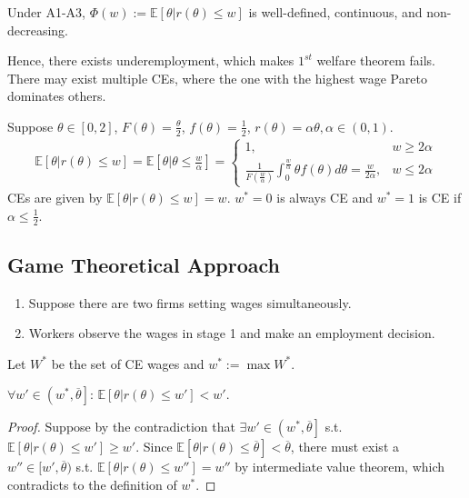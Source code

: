 \documentclass[11pt]{elegantbook_2}
\begin{document}
\begin{lemma}
    Under A1-A3, $\Phi(w):=\mathbb{E}[\theta|r(\theta)\leq w]$ is well-defined, continuous, and non-decreasing.
\end{lemma}

Hence, there exists underemployment, which makes $1^{st}$ welfare theorem fails. There may exist multiple CEs, where the one with the highest wage Pareto dominates others.

\begin{example}
    Suppose $\theta\in[0,2]$, $F(\theta)=\frac{\theta}{2}$, $f(\theta)=\frac{1}{2}$, $r(\theta)=\alpha\theta,\alpha\in(0,1)$.
    \begin{equation}
        \begin{aligned}
            \mathbb{E}[\theta|r(\theta)\leq w]=\mathbb{E}\left[\theta|\theta \leq \frac{w}{\alpha}\right]=\left\{\begin{matrix}
                1,&w\geq 2\alpha\\
                \frac{1}{F\left(\frac{w}{\alpha}\right)}\int_0^{\frac{w}{\alpha}}\theta f(\theta)d\theta=\frac{w}{2\alpha},&w\leq 2\alpha
            \end{matrix}\right.
        \end{aligned}
        \nonumber
    \end{equation}
    CEs are given by $\mathbb{E}[\theta|r(\theta)\leq w]=w$. $w^*=0$ is always CE and $w^*=1$ is CE if $\alpha\leq\frac{1}{2}$.
\end{example}

\subsection{Game Theoretical Approach}
\begin{enumerate}
    \item Suppose there are two firms setting wages simultaneously.
    \item Workers observe the wages in stage 1 and make an employment decision.
\end{enumerate}
Let $W^*$ be the set of CE wages and $w^*:=\max W^*$.
\begin{lemma}\label{lemma:ad_l2}
    $\forall w'\in\left(w^*,\overline{\theta}\right]$: $\mathbb{E}[\theta|r(\theta)\leq w']<w'$.
\end{lemma}
\begin{proof}
    Suppose by the contradiction that $\exists w'\in \left(w^*,\overline{\theta}\right]$ s.t. $\mathbb{E}[\theta|r(\theta)\leq w']\geq w'$. Since $\mathbb{E}[\theta|r(\theta)\leq \overline{\theta}]<\overline{\theta}$, there must exist a $w''\in [w',\overline{\theta})$ s.t. $\mathbb{E}[\theta|r(\theta)\leq w'']=w''$ by intermediate value theorem, which contradicts to the definition of $w^*$.
\end{proof}
\end{document}

